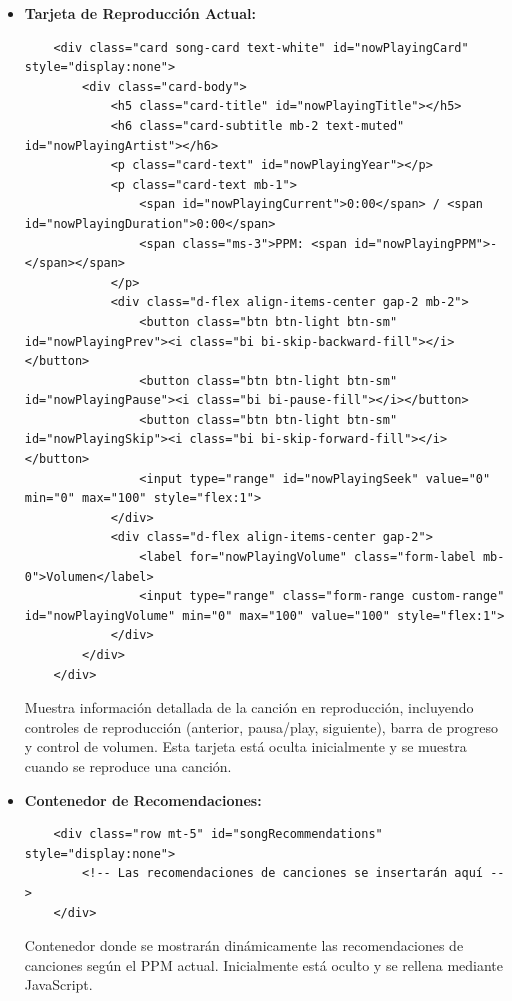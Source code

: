 \documentclass[a4paper,12pt]{article}
\begin{document}
\begin{itemize}
    \item \textbf{Tarjeta de Reproducción Actual:}
    \begin{verbatim}
    <div class="card song-card text-white" id="nowPlayingCard" style="display:none">
        <div class="card-body">
            <h5 class="card-title" id="nowPlayingTitle"></h5>
            <h6 class="card-subtitle mb-2 text-muted" id="nowPlayingArtist"></h6>
            <p class="card-text" id="nowPlayingYear"></p>
            <p class="card-text mb-1">
                <span id="nowPlayingCurrent">0:00</span> / <span id="nowPlayingDuration">0:00</span>
                <span class="ms-3">PPM: <span id="nowPlayingPPM">-</span></span>
            </p>
            <div class="d-flex align-items-center gap-2 mb-2">
                <button class="btn btn-light btn-sm" id="nowPlayingPrev"><i class="bi bi-skip-backward-fill"></i></button>
                <button class="btn btn-light btn-sm" id="nowPlayingPause"><i class="bi bi-pause-fill"></i></button>
                <button class="btn btn-light btn-sm" id="nowPlayingSkip"><i class="bi bi-skip-forward-fill"></i></button>
                <input type="range" id="nowPlayingSeek" value="0" min="0" max="100" style="flex:1">
            </div>
            <div class="d-flex align-items-center gap-2">
                <label for="nowPlayingVolume" class="form-label mb-0">Volumen</label>
                <input type="range" class="form-range custom-range" id="nowPlayingVolume" min="0" max="100" value="100" style="flex:1">
            </div>
        </div>
    </div>
    \end{verbatim}
    Muestra información detallada de la canción en reproducción, incluyendo controles de reproducción (anterior, pausa/play, siguiente), barra de progreso y control de volumen. Esta tarjeta está oculta inicialmente y se muestra cuando se reproduce una canción.

    \item \textbf{Contenedor de Recomendaciones:}
    \begin{verbatim}
    <div class="row mt-5" id="songRecommendations" style="display:none">
        <!-- Las recomendaciones de canciones se insertarán aquí -->
    </div>
    \end{verbatim}
    Contenedor donde se mostrarán dinámicamente las recomendaciones de canciones según el PPM actual. Inicialmente está oculto y se rellena mediante JavaScript.


\end{itemize}
\end{document}
